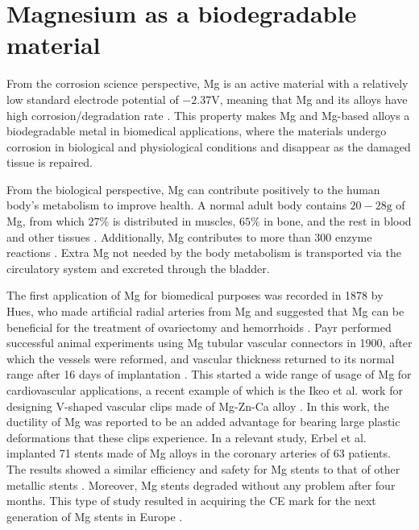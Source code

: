 \section{Magnesium as a biodegradable material}

From the corrosion science perspective, Mg is an active material with a relatively low standard electrode potential of $-2.37\text{V}$, meaning that Mg and its alloys have high corrosion/degradation rate \cite{Gao2022}. This property makes Mg and Mg-based alloys a biodegradable metal in biomedical applications, where the materials undergo corrosion in biological and physiological conditions and disappear as the damaged tissue is repaired. 

From the biological perspective, Mg can contribute positively to the human body's metabolism to improve health. A normal adult body contains $20-28\text{g}$ of Mg, from which $27\%$ is distributed in muscles, $65\%$ in bone, and the rest in blood and other tissues \cite{Vormann2003}. Additionally, Mg contributes to more than 300 enzyme reactions \cite{Elin1988}. Extra Mg not needed by the body metabolism is transported via the circulatory system and excreted through the bladder. 

The first application of Mg for biomedical purposes was recorded in 1878 by Hues, who made artificial radial arteries from Mg and suggested that Mg can be beneficial for the treatment of ovariectomy and hemorrhoids \cite{huse1878new}. Payr performed successful animal experiments using Mg tubular vascular connectors in 1900, after which the vessels were reformed, and vascular thickness returned to its normal range after 16 days of implantation \cite{Witte2010}. This started a wide range of usage of Mg for cardiovascular applications, a recent example of which is the Ikeo et al. work for designing V-shaped vascular clips made of Mg-Zn-Ca alloy \cite{Ikeo2016}. In this work, the ductility of Mg was reported to be an added advantage for bearing large plastic deformations that these clips experience. In a relevant study, Erbel et al. implanted 71 stents made of Mg alloys in the coronary arteries of 63 patients. The results showed a similar efficiency and safety for Mg stents to that of other metallic stents \cite{Erbel2007}. Moreover, Mg stents degraded without any problem after four months. This type of study resulted in acquiring the CE mark for the next generation of Mg stents in Europe \cite{Sotomi2017,GarciaGarcia2018}.

